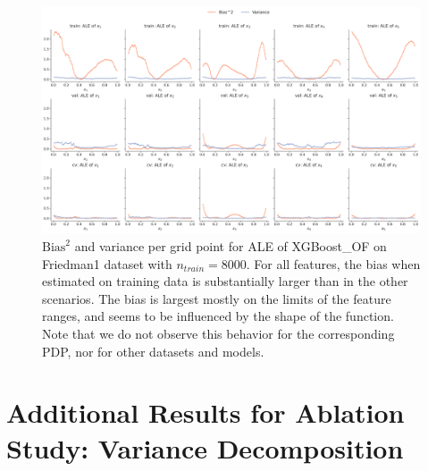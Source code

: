 \documentclass[runningheads]{llncs}
\begin{document}
\begin{figure}
    \centering
    \includegraphics[width=\textwidth]{img/further_investigation/friedman1_ale_XGBoost_OF_8000.png}
    \caption{$\text{Bias}^2$ and variance per grid point for ALE of XGBoost\_OF on Friedman1 dataset with $n_{train} = 8000$.
        For all features, the bias when estimated on training data is substantially larger than in the other scenarios. The bias
        is largest mostly on the limits of the feature ranges, and seems to be influenced by the shape of the function.
        Note that we do not observe this behavior for the corresponding PDP, nor for other datasets and models.
    }
    \label{fig:further-ale-xgb-friedman}  %
\end{figure}

\clearpage
\section{Additional Results for Ablation Study: Variance Decomposition}\label{app:additional-variance-decomposition}
\end{document}
